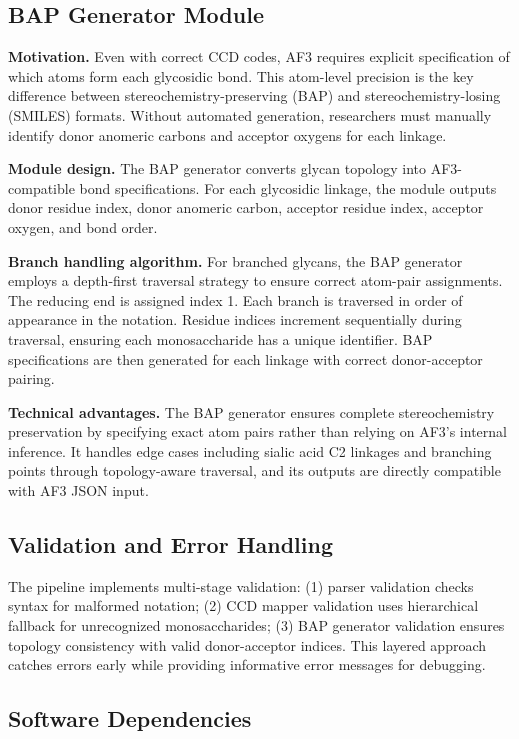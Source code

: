 \documentclass[11pt,a4paper]{article}
\begin{document}
\subsection{BAP Generator Module}

\textbf{Motivation.} Even with correct CCD codes, AF3 requires explicit specification of which atoms form each glycosidic bond. This atom-level precision is the key difference between stereochemistry-preserving (BAP) and stereochemistry-losing (SMILES) formats. Without automated generation, researchers must manually identify donor anomeric carbons and acceptor oxygens for each linkage.

\textbf{Module design.} The BAP generator converts glycan topology into AF3-compatible bond specifications. For each glycosidic linkage, the module outputs donor residue index, donor anomeric carbon, acceptor residue index, acceptor oxygen, and bond order.

\textbf{Branch handling algorithm.} For branched glycans, the BAP generator employs a depth-first traversal strategy to ensure correct atom-pair assignments. The reducing end is assigned index 1. Each branch is traversed in order of appearance in the notation. Residue indices increment sequentially during traversal, ensuring each monosaccharide has a unique identifier. BAP specifications are then generated for each linkage with correct donor-acceptor pairing.

\textbf{Technical advantages.} The BAP generator ensures complete stereochemistry preservation by specifying exact atom pairs rather than relying on AF3's internal inference. It handles edge cases including sialic acid C2 linkages and branching points through topology-aware traversal, and its outputs are directly compatible with AF3 JSON input.

\subsection{Validation and Error Handling}

The pipeline implements multi-stage validation: (1) parser validation checks syntax for malformed notation; (2) CCD mapper validation uses hierarchical fallback for unrecognized monosaccharides; (3) BAP generator validation ensures topology consistency with valid donor-acceptor indices. This layered approach catches errors early while providing informative error messages for debugging.

\subsection{Software Dependencies}
\end{document}
